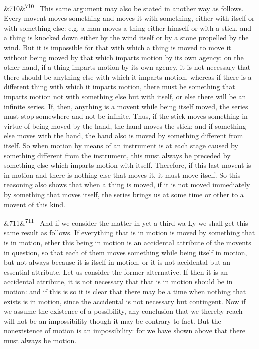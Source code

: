\documentclass[12pt]{article}
\newcommand{\para}[1][]{\par\noindent\ifx&#1&\else\textsuperscript{\footnotesize #1}~\fi}
\begin{document}
\para[710] This same argument may also be stated in another way as follows. Every movent moves something and moves it with something, either with itself or with something else: e.g. a man moves a thing either himself or with a stick, and a thing is knocked down either by the wind itself or by a stone propelled by the wind. But it is impossible for that with which a thing is moved to move it without being moved by that which imparts motion by its own agency: on the other hand, if a thing imparts motion by its own agency, it is not necessary that there should be anything else with which it imparts motion, whereas if there is a different thing with which it imparts motion, there must be something that imparts motion not with something else but with itself, or else there will be an infinite series. If, then, anything is a movent while being itself moved, the series must stop somewhere and not be infinite. Thus, if the stick moves something in virtue of being moved by the hand, the hand moves the stick: and if something else moves with the hand, the hand also is moved by something different from itself. So when motion by means of an instrument is at each stage caused by something different from the instrument, this must always be preceded by something else which imparts motion with itself. Therefore, if this last movent is in motion and there is nothing else that moves it, it must move itself. So this reasoning also shows that when a thing is moved, if it is not moved immediately by something that moves itself, the series brings us at some time or other to a movent of this kind.

\para[711] And if we consider the matter in yet a third wa Ly we shall get this same result as follows. If everything that is in motion is moved by something that is in motion, ether this being in motion is an accidental attribute of the movents in question, so that each of them moves something while being itself in motion, but not always because it is itself in motion, or it is not accidental but an essential attribute. Let us consider the former alternative. If then it is an accidental attribute, it is not necessary that that is in motion should be in motion: and if this is so it is clear that there may be a time when nothing that exists is in motion, since the accidental is not necessary but contingent. Now if we assume the existence of a possibility, any conclusion that we thereby reach will not be an impossibility though it may be contrary to fact. But the nonexistence of motion is an impossibility: for we have shown above that there must always be motion.
\end{document}
